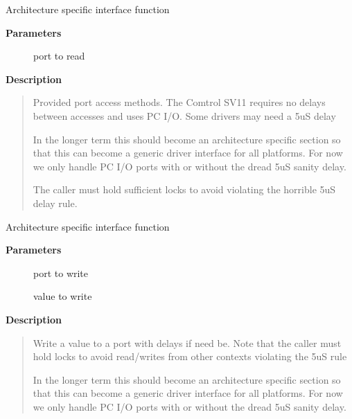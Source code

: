 \documentclass[a4paper,8pt,english]{sphinxmanual}
\begin{document}
\begin{fulllineitems}
\label{networking/z8530book:c.z8530_read_port}
Architecture specific interface function

\end{fulllineitems}


\textbf{Parameters}
\begin{description}
\item[{}] \leavevmode
port to read

\end{description}

\textbf{Description}
\begin{quote}

Provided port access methods. The Comtrol SV11 requires no delays
between accesses and uses PC I/O. Some drivers may need a 5uS delay

In the longer term this should become an architecture specific
section so that this can become a generic driver interface for all
platforms. For now we only handle PC I/O ports with or without the
dread 5uS sanity delay.

The caller must hold sufficient locks to avoid violating the horrible
5uS delay rule.
\end{quote}

\begin{fulllineitems}
\label{networking/z8530book:c.z8530_write_port}
Architecture specific interface function

\end{fulllineitems}


\textbf{Parameters}
\begin{description}
\item[{}] \leavevmode
port to write

\item[{}] \leavevmode
value to write

\end{description}

\textbf{Description}
\begin{quote}

Write a value to a port with delays if need be. Note that the
caller must hold locks to avoid read/writes from other contexts
violating the 5uS rule

In the longer term this should become an architecture specific
section so that this can become a generic driver interface for all
platforms. For now we only handle PC I/O ports with or without the
dread 5uS sanity delay.
\end{quote}
\end{document}
